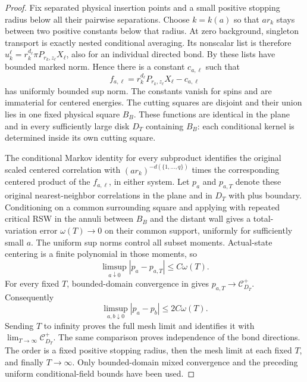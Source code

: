 \begin{proof}
Fix separated physical insertion points and a small positive stopping
radius below all their pairwise separations. Choose $k=k(a)$ so that
$a r_k$ stays between two positive constants below that radius.
At zero background, singleton transport is exactly nested conditional
averaging. Its nonscalar list is therefore
$u_k^\ell=r_k^{d_\ell}\pi P_{r_k,z_\ell}X_\ell$, also for an individual
directed bond. By  these lists have bounded
marked norm. Hence there is a constant $c_{a,\ell}$ such that
\[
 f_{a,\ell}=r_k^{d_\ell}P_{r_k,z_\ell}X_\ell-c_{a,\ell}
\]
has uniformly bounded sup norm.
The constants vanish for spins and are immaterial for centered energies.
The cutting squares are disjoint and their union lies in one fixed
physical square $B_B$. These functions are identical in the plane and
in every sufficiently large disk $D_T$ containing $B_B$: each conditional
kernel is determined inside its own cutting square.

The conditional Markov identity for every subproduct identifies the
original scaled centered correlation with
$(a r_k)^{-d(\{1,\ldots,q\})}$ times the corresponding centered product
of the $f_{a,\ell}$, in either system. Let $p_a$ and $p_{a,T}$ denote
these original nearest-neighbor correlations in the plane and in $D_T$
with plus boundary. Conditioning on a common surrounding square and
applying  with repeated critical RSW in the annuli between
$B_B$ and the distant wall gives a total-variation error $\omega(T)\to0$
on their common support, uniformly for sufficiently small $a$.
The uniform sup norms control all subset moments. Actual-state centering
is a finite polynomial in those moments, so
\[
 \limsup_{a\downarrow0}|p_a-p_{a,T}|\le C\omega(T).
\]
For every fixed $T$, bounded-domain convergence in  gives
$p_{a,T}\to\mathcal C_{D_T}^{+}$. Consequently
\[
 \limsup_{a,b\downarrow0}|p_a-p_b|\le2C\omega(T).
\]
Sending $T$ to infinity proves the full mesh limit and identifies it with
$\lim_{T\to\infty}\mathcal C_{D_T}^{+}$. The same comparison proves
independence of the bond directions. The order is a fixed positive
stopping radius, then the mesh limit at each fixed $T$, and finally
$T\to\infty$. Only bounded-domain mixed convergence and the preceding
uniform conditional-field bounds have been used.
\end{proof}

